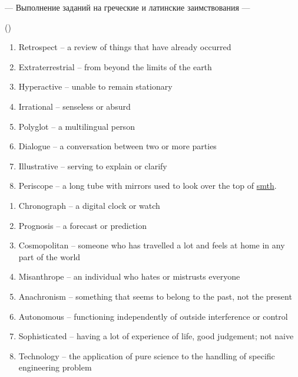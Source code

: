 \documentclass[main.tex]{subfiles}
\begin{document}


\hypertarget{ltask:2024-01-31-1}{--- Выполнение заданий на греческие и латинские заимствования ---} (\hyperref[task:2024-01-31-1]{\color{blue}{перейти к тексту заданий}})
\vspace{5pt}


\begin{enumerate}[nosep]
	\itemsep\eitsp
	\item Retrospect -- a review of things that have already occurred
	\item Extraterrestrial -- from beyond the limits of the earth
	\item Hyperactive -- unable to remain stationary
	\item Irrational -- senseless or absurd
	\item Polyglot -- a multilingual person
	\item Dialogue -- a conversation between two or more parties
	\item Illustrative -- serving to explain or clarify
	\item Periscope -- a long tube with mirrors used to look over the top of \uline{smth}.
\end{enumerate}
\vspace{5pt}


\begin{enumerate}[nosep]
	\itemsep\eitsp
	\item Chronograph -- a digital clock or watch
	\item Prognosis -- a forecast or prediction
	\item Cosmopolitan -- someone who has travelled a lot and feels at home in any part of the world
	\item Misanthrope -- an individual who hates or mistrusts everyone
	\item Anachronism -- something that seems to belong to the past, not the present
	\item Autonomous -- functioning independently of outside interference or control
	\item Sophisticated -- having a lot of experience of life, good judgement; not naive
	\item Technology -- the application of pure science to the handling of specific engineering problem
\end{enumerate}
\vspace{5pt}
\end{document}
